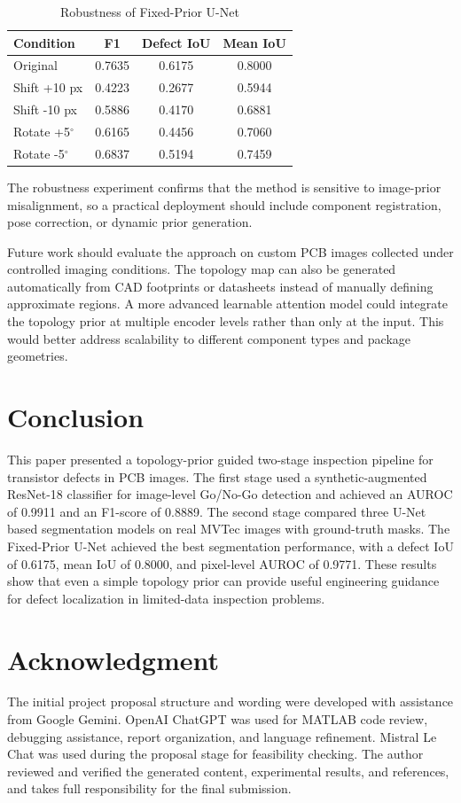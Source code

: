 \documentclass[conference,a4paper]{IEEEtran}
\begin{document}
\begin{table}[!t]
\centering
\caption{Robustness of Fixed-Prior U-Net}
\label{tab:robustness}
\begin{tabular}{lccc}
\toprule
Condition & F1 & Defect IoU & Mean IoU \\
\midrule
Original & 0.7635 & 0.6175 & 0.8000 \\
Shift +10 px & 0.4223 & 0.2677 & 0.5944 \\
Shift -10 px & 0.5886 & 0.4170 & 0.6881 \\
Rotate +5$^\circ$ & 0.6165 & 0.4456 & 0.7060 \\
Rotate -5$^\circ$ & 0.6837 & 0.5194 & 0.7459 \\
\bottomrule
\end{tabular}
\end{table}

The robustness experiment confirms that the method is sensitive to image-prior misalignment, so a practical deployment should include component registration, pose correction, or dynamic prior generation.

Future work should evaluate the approach on custom PCB images collected under controlled imaging conditions. The topology map can also be generated automatically from CAD footprints or datasheets instead of manually defining approximate regions. A more advanced learnable attention model could integrate the topology prior at multiple encoder levels rather than only at the input. This would better address scalability to different component types and package geometries.

\section{Conclusion}

This paper presented a topology-prior guided two-stage inspection pipeline for transistor defects in PCB images. The first stage used a synthetic-augmented ResNet-18 classifier for image-level Go/No-Go detection and achieved an AUROC of 0.9911 and an F1-score of 0.8889. The second stage compared three U-Net based segmentation models on real MVTec images with ground-truth masks. The Fixed-Prior U-Net achieved the best segmentation performance, with a defect IoU of 0.6175, mean IoU of 0.8000, and pixel-level AUROC of 0.9771. These results show that even a simple topology prior can provide useful engineering guidance for defect localization in limited-data inspection problems.

\section*{Acknowledgment}

The initial project proposal structure and wording were developed with assistance from Google Gemini. OpenAI ChatGPT was used for MATLAB code review, debugging assistance, report organization, and language refinement. Mistral Le Chat was used during the proposal stage for feasibility checking. The author reviewed and verified the generated content, experimental results, and references, and takes full responsibility for the final submission.

\balance


\end{document}
